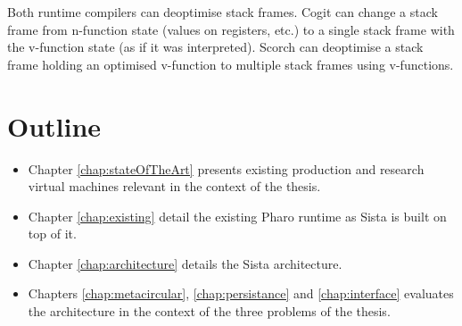 \documentclass[a4paper,12pt,twoside]{../includes/ThesisStyle}
\begin{document}
Both runtime compilers can deoptimise stack frames. Cogit can change a stack frame from n-function state (values on registers, etc.) to a single stack frame with the v-function state (as if it was interpreted). Scorch can deoptimise a stack frame holding an optimised v-function to multiple stack frames using v-functions. 

\section{Outline}

\begin{itemize}
	\item Chapter \ref{chap:stateOfTheArt} presents existing production and research virtual machines relevant in the context of the thesis. 
	\item Chapter \ref{chap:existing} detail the existing Pharo runtime as Sista is built on top of it.
	\item Chapter \ref{chap:architecture} details the Sista architecture. 
	\item Chapters \ref{chap:metacircular}, \ref{chap:persistance} and \ref{chap:interface} evaluates the architecture in the context of the three problems of the thesis.
\end{itemize}



\ifx\wholebook\relax\else
    
\end{document}
